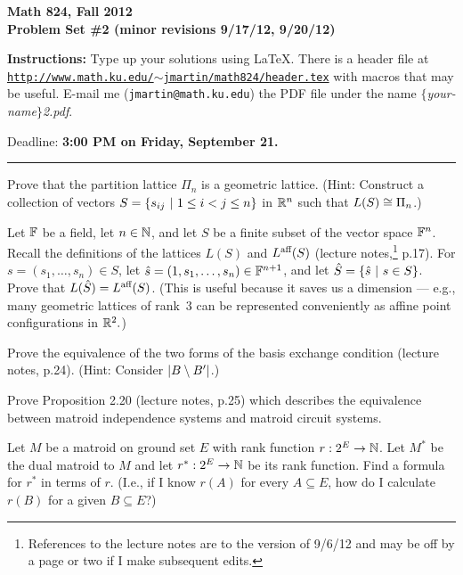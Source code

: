 

\bf Math 824, Fall 2012\\
Problem Set \#2 (minor revisions 9/17/12, 9/20/12)\rm

{\bf Instructions:} Type up your solutions using LaTeX.  There is a
header file at\\
\href{http://www.jlmartin.faculty.ku.edu/math824/header.tex}{\tt http://www.math.ku.edu/$\sim$jmartin/math824/header.tex} with macros that may be useful.
E-mail me (\texttt{jmartin@math.ku.edu}) the PDF file under the name \textsl{$\{$your-name$\}$2.pdf}.

Deadline: {\bf 3:00 PM on Friday, September 21.}
\smallskip\hrule

\prob Prove that the partition lattice $\Pi_n$ is a geometric lattice.  (Hint:
Construct a collection of vectors $S=\{s_{ij} ~|~ 1\leq i<j\leq n\}$
in $\mathbb{R}^n$ such that $L(S)\cong\Pi_n$.)

\prob Let $\mathbb{F}$ be a field, let $n\in\mathbb{N}$, and
let $S$ be a finite subset of the vector space $\mathbb{F}^n$.
Recall the definitions of the lattices $L(S)$ and $L^{\text{aff}}(S)$
(lecture notes,\footnote{References to the lecture notes are to the version of 9/6/12 and may be off by a page or two if I make subsequent edits.} p.17).  For
$s=(s_1,\dots,s_n)\in S$, let $\hat s=(1,s_1,\dots,s_n)\in\mathbb{F}^{n+1}$, and let
$\hat S=\{\hat s~|~ s\in S\}$.
Prove that $L(\hat S)=L^{\text{aff}}(S)$.  (This is useful because it saves us a dimension --- e.g., many geometric lattices of rank~3 can be represented conveniently as affine point configurations in $\mathbb{R}^2.$)

\prob Prove the equivalence of the two forms of the basis exchange condition
(lecture notes, p.24).
(Hint: Consider $|B\setminus B'|$.)

\prob Prove Proposition 2.20 (lecture notes, p.25)
which describes the equivalence between matroid independence systems
and matroid circuit systems.

\prob Let $M$ be a matroid on ground set $E$ with rank function $r:2^E\to\mathbb{N}$.
Let $M^*$ be the dual matroid to $M$ and let $r^*:2^E\to\mathbb{N}$ be its rank function.
Find a formula for $r^*$ in terms of $r$.  (I.e., if I know $r(A)$ for every $A\subseteq E$,
how do I calculate $r(B)$ for a given $B\subseteq E$?)


